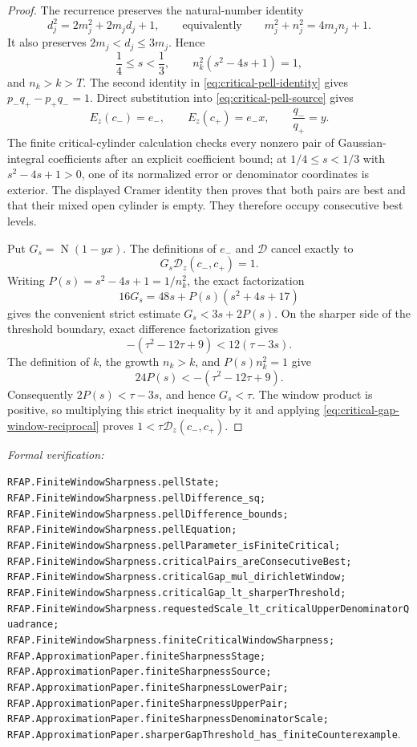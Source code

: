 \documentclass[11pt]{article}
\newcommand{\Norm}[1]{\operatorname{N}\!\left(#1\right)}
\newcommand{\leanref}[1]{\par\smallskip\noindent
  \emph{Formal verification:}\par\nobreak
  {\raggedright\nolinkurl{#1}.\par}}
\begin{document}
\begin{proof}
The recurrence preserves the natural-number identity
\begin{equation}
\label{eq:critical-pell-identity}
 d_j^2=2m_j^2+2m_jd_j+1,
 \qquad\text{equivalently}\qquad
 m_j^2+n_j^2=4m_jn_j+1.
\end{equation}
It also preserves $2m_j<d_j\le3m_j$.  Hence
\[
 \frac14\le s<\frac13,
 \qquad
 n_k^2(s^2-4s+1)=1,
\]
and $n_k>k>T$.  The second identity in
\eqref{eq:critical-pell-identity} gives
$p_-q_+-p_+q_-=1$.  Direct substitution into
\eqref{eq:critical-pell-source} gives
\[
 E_z(c_-)=e_-,
 \qquad E_z(c_+)=e_-x,
 \qquad \frac{q_-}{q_+}=y.
\]
The finite critical-cylinder calculation checks every nonzero pair of
Gaussian-integral coefficients after an explicit coefficient bound; at
$1/4\le s<1/3$ with $s^2-4s+1>0$, one of its normalized error or denominator
coordinates is exterior.  The displayed Cramer identity then proves that
both pairs are best and that their mixed open cylinder is empty.  They
therefore occupy consecutive best levels.

Put $G_s=\Norm{1-yx}$.  The definitions of $e_-$ and $\mathcal D$ cancel
exactly to
\begin{equation}
\label{eq:critical-gap-window-reciprocal}
             G_s\mathcal D_z(c_-,c_+)=1.
\end{equation}
Writing $P(s)=s^2-4s+1=1/n_k^2$, the exact factorization
\[
 16G_s=48s+P(s)(s^2+4s+17)
\]
gives the convenient strict estimate $G_s<3s+2P(s)$.  On the sharper side
of the threshold boundary, exact difference factorization gives
\[
 -(\tau^2-12\tau+9)<12(\tau-3s).
\]
The definition of $k$, the growth $n_k>k$, and $P(s)n_k^2=1$ give
\[
 24P(s)<-(\tau^2-12\tau+9).
\]
Consequently $2P(s)<\tau-3s$, and hence $G_s<\tau$.  The window product is
positive, so multiplying this strict inequality by it and applying
\eqref{eq:critical-gap-window-reciprocal} proves
$1<\tau\mathcal D_z(c_-,c_+)$.
\end{proof}

\leanref{RFAP.FiniteWindowSharpness.pellState;
RFAP.FiniteWindowSharpness.pellDifference_sq;
RFAP.FiniteWindowSharpness.pellDifference_bounds;
RFAP.FiniteWindowSharpness.pellEquation;
RFAP.FiniteWindowSharpness.pellParameter_isFiniteCritical;
RFAP.FiniteWindowSharpness.criticalPairs_areConsecutiveBest;
RFAP.FiniteWindowSharpness.criticalGap_mul_dirichletWindow;
RFAP.FiniteWindowSharpness.criticalGap_lt_sharperThreshold;
RFAP.FiniteWindowSharpness.requestedScale_lt_criticalUpperDenominatorQuadrance;
RFAP.FiniteWindowSharpness.finiteCriticalWindowSharpness;
RFAP.ApproximationPaper.finiteSharpnessStage;
RFAP.ApproximationPaper.finiteSharpnessSource;
RFAP.ApproximationPaper.finiteSharpnessLowerPair;
RFAP.ApproximationPaper.finiteSharpnessUpperPair;
RFAP.ApproximationPaper.finiteSharpnessDenominatorScale;
RFAP.ApproximationPaper.sharperGapThreshold_has_finiteCounterexample}
\end{document}
